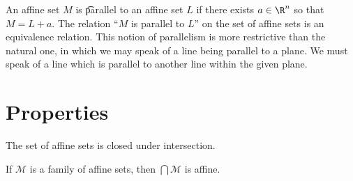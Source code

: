 An affine set $M$ is \t{parallel} to an affine set $L$ if there exists $a \in \R ^n$ so that $M = L + a$.
The relation ``$M$ is parallel to $L$'' on the set of affine sets is an equivalence relation.
This notion of parallelism is more restrictive than the natural one, in which we may speak of a line being parallel to a plane.
We must speak of a line which is parallel to another line within the given plane.

\section*{Properties}

The set of affine sets is closed under intersection.
\begin{proposition}
If $\mathcal{M} $ is a family of affine sets, then $\bigcap\mathcal{M} $ is affine.
\end{proposition}


